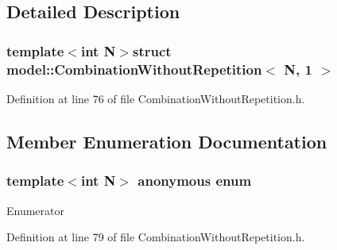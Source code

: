 \subsection{Detailed Description}
\subsubsection*{template$<$int N$>$struct model\+::\+Combination\+Without\+Repetition$<$ N, 1 $>$}



Definition at line 76 of file Combination\+Without\+Repetition.\+h.



\subsection{Member Enumeration Documentation}
\hypertarget{structmodel_1_1_combination_without_repetition_3_01_n_00_011_01_4_a3f3bc5918973d2a164a3b3532b9bca22}{}\subsubsection[{anonymous enum}]{\setlength{\rightskip}{0pt plus 5cm}template$<$int N$>$ anonymous enum}\label{structmodel_1_1_combination_without_repetition_3_01_n_00_011_01_4_a3f3bc5918973d2a164a3b3532b9bca22}
\begin{Desc}
\item[Enumerator]\par
\begin{description}
\item[{\em 
\hypertarget{structmodel_1_1_combination_without_repetition_3_01_n_00_011_01_4_a3f3bc5918973d2a164a3b3532b9bca22abf89bd4763c1a1f9402216f1cb119b61}{}k\label{structmodel_1_1_combination_without_repetition_3_01_n_00_011_01_4_a3f3bc5918973d2a164a3b3532b9bca22abf89bd4763c1a1f9402216f1cb119b61}
}]\end{description}
\end{Desc}


Definition at line 79 of file Combination\+Without\+Repetition.\+h.

